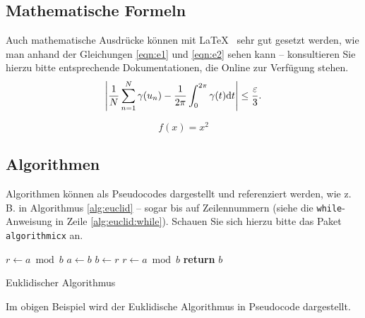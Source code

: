 \subsection{Mathematische Formeln}
Auch mathematische Ausdrücke können mit \LaTeX~ sehr gut gesetzt werden, wie man anhand der 
Gleichungen \vref{eqn:e1} und \vref{eqn:e2} sehen kann -- konsultieren Sie hierzu bitte entsprechende Dokumentationen, 
die Online zur Verfügung stehen.
\begin{equation}
\left|{1\over N}\sum_{n=1}^N \gamma(u_n)-{1\over 2\pi}\int_0^{2\pi}\gamma(t){\rm d}t\right| \le {\varepsilon\over 3}.\\
\label{eqn:e1}
\end{equation}

\begin{equation}
f(x)=x^2
\label{eqn:e2}
\end{equation}

\subsection{Algorithmen}
Algorithmen können als Pseudocodes dargestellt und referenziert werden, wie z.\,B. in Algorithmus \vref{alg:euclid} -- 
sogar bis auf Zeilennummern (siehe die \texttt{while}-Anweisung in Zeile \vref{alg:euclid:while}). Schauen Sie sich hierzu bitte das 
Paket \texttt{algorithmicx} an.

\begin{algorithm}[H]
\begin{algorithmic}[1]
   \State $r\gets a\bmod b$
    \label{alg:euclid:while}
      \State $a\gets b$
      \State $b\gets r$
      \State $r\gets a\bmod b$
   \EndWhile\label{euclidendwhile}
   \State \textbf{return} $b$
\EndProcedure
\end{algorithmic}
\caption{Euklidischer Algorithmus}\label{alg:euclid}
\end{algorithm}

Im obigen Beispiel wird der Euklidische Algorithmus in Pseudocode dargestellt. 
